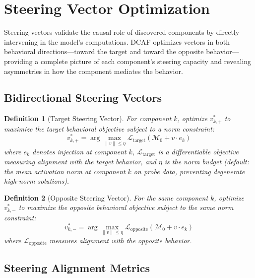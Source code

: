 \documentclass[11pt]{article}
\newtheorem{definition}{Definition}[section]
\begin{document}
\section{Steering Vector Optimization}
\label{sec:steering}

Steering vectors validate the causal role of discovered components by directly intervening in the model's computations. DCAF optimizes vectors in both behavioral directions---toward the target and toward the opposite behavior---providing a complete picture of each component's steering capacity and revealing asymmetries in how the component mediates the behavior.

\subsection{Bidirectional Steering Vectors}
\label{sec:bidirectional-steering-vectors}

\begin{definition}[Target Steering Vector]
\label{def:target-steering-vector}
For component $k$, optimize $v^*_{k,+}$ to maximize the target behavioral objective subject to a norm constraint:
\begin{equation}
v^*_{k,+} = \arg\max_{\|v\| \leq \eta} \mathcal{L}_{\text{target}}(\mathcal{M}_0 + v \cdot e_k)
\end{equation}
where $e_k$ denotes injection at component $k$, $\mathcal{L}_{\text{target}}$ is a differentiable objective measuring alignment with the target behavior, and $\eta$ is the norm budget (default: the mean activation norm at component $k$ on probe data, preventing degenerate high-norm solutions).
\end{definition}

\begin{definition}[Opposite Steering Vector]
\label{def:opposite-steering-vector}
For the same component $k$, optimize $v^*_{k,-}$ to maximize the opposite behavioral objective subject to the same norm constraint:
\begin{equation}
v^*_{k,-} = \arg\max_{\|v\| \leq \eta} \mathcal{L}_{\text{opposite}}(\mathcal{M}_0 + v \cdot e_k)
\end{equation}
where $\mathcal{L}_{\text{opposite}}$ measures alignment with the opposite behavior.
\end{definition}

\subsection{Steering Alignment Metrics}
\label{sec:steering-alignment-metrics}
\end{document}
